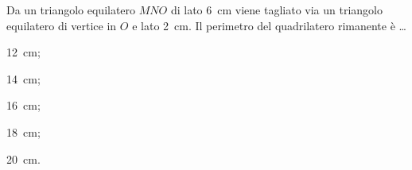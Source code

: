 
\begin{esercizio}
\label{ese:2.100}
Da un triangolo equilatero $MNO$ di lato 6~cm viene tagliato via un triangolo equilatero di vertice in $O$ e lato 2~cm. Il perimetro del quadrilatero rimanente è \ldots
\begin{multicols}{5}
\begin{enumeratea}
\item 12~cm;
\item 14~cm;
\item 16~cm;
\item 18~cm;
\item 20~cm.
\end{enumeratea}
\end{multicols}
\end{esercizio}
